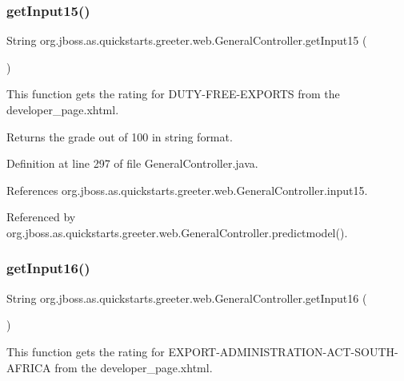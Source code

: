 \subsubsection{\texorpdfstring{get\+Input15()}{getInput15()}}
{\footnotesize\ttfamily String org.\+jboss.\+as.\+quickstarts.\+greeter.\+web.\+General\+Controller.\+get\+Input15 (\begin{DoxyParamCaption}{ }\end{DoxyParamCaption})}



This function gets the rating for D\+U\+T\+Y-\/\+F\+R\+E\+E-\/\+E\+X\+P\+O\+R\+TS from the developer\+\_\+page.\+xhtml. 

\begin{DoxyReturn}{Returns}
the grade out of 100 in string format. 
\end{DoxyReturn}


Definition at line 297 of file General\+Controller.\+java.



References org.\+jboss.\+as.\+quickstarts.\+greeter.\+web.\+General\+Controller.\+input15.



Referenced by org.\+jboss.\+as.\+quickstarts.\+greeter.\+web.\+General\+Controller.\+predictmodel().

\mbox{\label{classorg_1_1jboss_1_1as_1_1quickstarts_1_1greeter_1_1web_1_1_general_controller_a52d8f1adedb7af09f1289aa0ea1a25dd}} 
\subsubsection{\texorpdfstring{get\+Input16()}{getInput16()}}
{\footnotesize\ttfamily String org.\+jboss.\+as.\+quickstarts.\+greeter.\+web.\+General\+Controller.\+get\+Input16 (\begin{DoxyParamCaption}{ }\end{DoxyParamCaption})}



This function gets the rating for E\+X\+P\+O\+R\+T-\/\+A\+D\+M\+I\+N\+I\+S\+T\+R\+A\+T\+I\+O\+N-\/\+A\+C\+T-\/\+S\+O\+U\+T\+H-\/\+A\+F\+R\+I\+CA from the developer\+\_\+page.\+xhtml. 

